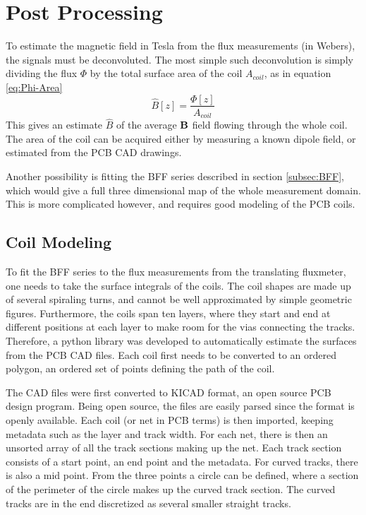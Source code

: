 \chapter{Post Processing}
To estimate the magnetic field in Tesla from the flux measurements
(in Webers), the signals must be deconvoluted. The most simple
such deconvolution is simply dividing the flux $\Phi$ by the total surface
area of the coil $A_{coil}$, as in equation \ref{eq:Phi-Area}
\begin{equation}
    \hat{B}[z] = \frac{\Phi[z]}{A_{coil}}
    \label{eq:Phi-Area}
\end{equation}
This gives an estimate $\hat{B}$ of the average $\vb{B}$ field
flowing through the whole coil. The area of the coil can be acquired
either by measuring a known dipole field, or estimated from the
PCB CAD drawings.

Another possibility is fitting the BFF series described in section
\ref{subsec:BFF}, which would give a full three dimensional map of
the whole measurement domain. This is more complicated however,
and requires good modeling of the PCB coils.

\section{Coil Modeling}
To fit the BFF series to the flux measurements from the translating
fluxmeter, one needs to take the surface integrals of the coils.
The coil shapes are made up of several spiraling turns, and cannot be
well approximated by simple geometric figures.
Furthermore, the coils span ten layers,
where they start and end at different positions at each layer to make
room for the vias connecting the tracks. Therefore, a python library
was developed to automatically estimate the surfaces from the
PCB CAD files. Each coil first needs to be converted to an
ordered polygon, an ordered set of points defining the path
of the coil.

The CAD files were first converted to KICAD format, an open source
PCB design program. Being open source, the files are easily parsed
since the format is openly available. \cite{noauthor_board_nodate}
Each coil (or net in PCB terms) is then imported, keeping metadata such as
the layer and track width. For each net, there is then an unsorted
array of all the track sections making up the net. Each track
section consists of a start point, an end point and the metadata.
For curved tracks, there is also a mid point. From the three points
a circle can be defined, where a section of the perimeter of the
circle makes up the curved track section. The curved tracks are in the
end discretized as several smaller straight tracks.

